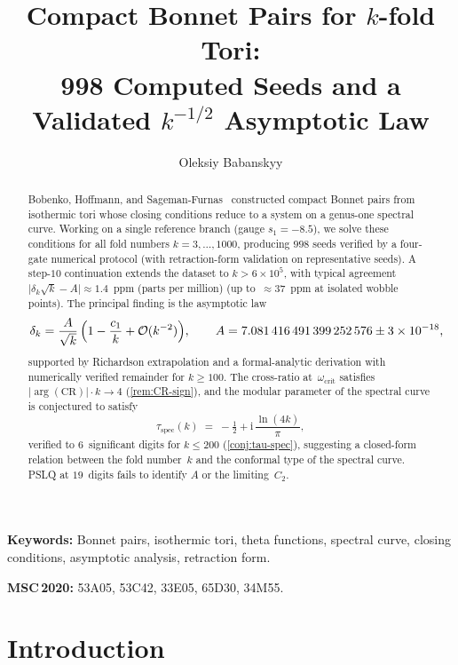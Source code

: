 \documentclass[11pt,a4paper]{article}
\title{%
  Compact Bonnet Pairs for $k$-fold Tori:\\
  998 Computed Seeds and a Validated $k^{-1/2}$
  Asymptotic Law}
\author{%
  Oleksiy Babanskyy
}
\date{}
\theoremstyle{plain}
\theoremstyle{definition}
\theoremstyle{remark}
\newcommand{\ii}{\mathrm{i}}
\newcommand{\Oo}{\mathcal{O}}
\begin{document}
\maketitle

\begin{abstract}
Bobenko, Hoffmann, and Sageman-Furnas~\cite{BHS25,BHS-comp} constructed
compact Bonnet pairs from isothermic tori whose closing conditions
reduce to a system on a genus-one spectral curve.
Working on a single reference branch (gauge $s_1 = -8.5$),
we solve these conditions for all fold numbers
$k = 3,\ldots,1000$, producing $998$ seeds verified
by a four-gate numerical protocol
(with retraction-form validation on representative seeds).
A step-$10$ continuation extends the dataset
to $k > 6\times 10^5$, with typical agreement
$\lvert\delta_k\sqrt{k} - A\rvert \approx 1.4$~ppm (parts per million)
(up to~$\approx 37$~ppm at isolated wobble points).
The principal finding is the asymptotic law
\[
  \delta_k = \frac{A}{\sqrt{k}}\,\Bigl(1 - \frac{c_1}{k}
  + \Oo(k^{-2})\Bigr),
  \qquad A = 7.081\,416\,491\,399\,252\,576 \pm 3 \times 10^{-18},
\]
supported by Richardson extrapolation and a formal-analytic derivation
with numerically verified remainder for $k \ge 100$.
The cross-ratio at~$\omega_{\mathrm{crit}}$ satisfies
$\lvert\arg(\mathrm{CR})\rvert \cdot k \to 4$ (\cref{rem:CR-sign}),
and the modular parameter of the spectral curve is conjectured to satisfy
\[
  \tau_{\mathrm{spec}}(k)
  \;=\; -\tfrac{1}{2} + \ii\,\frac{\ln(4k)}{\pi},
\]
verified to $6$~significant digits for $k \le 200$
(\cref{conj:tau-spec}), suggesting a closed-form relation between
the fold number~$k$ and the conformal type of the spectral curve.
PSLQ at $19$~digits fails to identify $A$ or the limiting~$C_2$.
\end{abstract}

\smallskip
\noindent\textbf{Keywords:}
  Bonnet pairs, isothermic tori, theta functions, spectral curve,
  closing conditions, asymptotic analysis, retraction form.

\smallskip
\noindent\textbf{MSC\,2020:}
  53A05, 53C42, 33E05, 65D30, 34M55.

\section{Introduction}\label{sec:intro}
\end{document}
